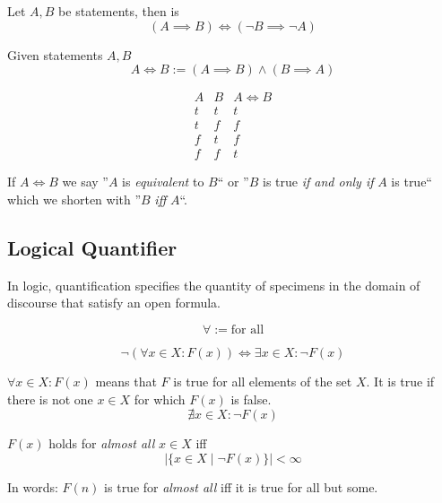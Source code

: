 \begin{proposition}[Contraposition]
   Let \(A, B\) be statements, then is
   \[(A \implies B) \iff (\neg B \implies \neg A)\]
\end{proposition}

\begin{definition}
   Given statements \(A, B\)
   \[A \iff B := (A \implies B) \land (B \implies A)\]

   \[\begin{array}{c|c||c}
         A & B & A \iff B \\
         \hline
         t & t & t \\
         t & f & f \\
         f & t & f \\
         f & f & t
   \end{array}\]
\end{definition}
\begin{remark}
   If \(A \iff B\) we say ''\(A\) is \textit{equivalent} to \(B\)`` or ''\(B\) is true \textit{if and only if} \(A\) is true`` which we shorten with ''\(B\) \textit{iff} \(A\)``.
\end{remark}

\subsection{Logical Quantifier}
In logic, quantification specifies the quantity of specimens in the domain of discourse that satisfy an open formula.

\begin{definition}
   \[\forall := \text{for all}\]
\end{definition}
\begin{remark}
   \[\neg(\forall x \in X: F(x)) \iff \exists x \in X: \neg F(x)\]
\end{remark}
\begin{example}
   \(\forall x \in X: F(x)\) means that \(F\) is true for all elements of the set \(X\).
   It is true if there is not one \(x \in X\) for which \(F(x)\) is false.
   \[\nexists x \in X: \neg F(x)\]
\end{example}

\begin{definition}
   \(F(x)\) holds for \emph{almost all} \(x \in X\) iff
   \[\Big|\big\{x \in X \mid \neg F(x)\big\}\Big| < \infty\]
\end{definition}
\begin{remark}
   In words: \(F(n)\) is true for \emph{almost all} iff it is true for all but some.
\end{remark}

